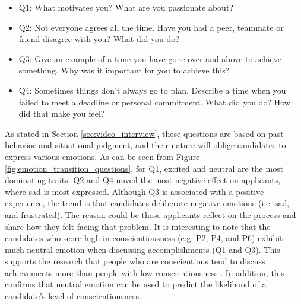 %
%
\begin{itemize}
    \item[] Q1: What motivates you? What are you passionate about?
    \item[] Q2: Not everyone agrees all the time. Have you had a peer, teammate or friend disagree with you? What did you do?
    \item[] Q3: Give an example of a time you have gone over and above to achieve something. Why was it important for you to achieve this?
    \item[] Q4: Sometimes things don’t always go to plan. Describe a time when you failed to meet a deadline or personal commitment. What did you do? How did that make you feel? 
\end{itemize}
%
As stated in Section \ref{sec:video_interview}, these questions are based on past behavior and situational judgment, and their nature will oblige candidates to express various emotions. As can be seen from Figure \ref{fig:emotion_transition_questions}, for Q1, excited and neutral are the most dominating traits. Q2 and Q4 unveil the most negative effect on applicants, where sad is most expressed. Although Q3 is associated with a positive experience, the trend is that candidates deliberate negative emotions (i.e. sad, and frustrated). The reason could be those applicants reflect on the process and share how they felt facing that problem. It is interesting to note that the candidates who score high in conscientiousness (e.g. P2, P4, and P6) exhibit much neutral emotion when discussing accomplishments (Q1 and Q3). This supports the research that people who are conscientious tend to discuss achievements more than people with low conscientiousness \cite{conscientiousness1-HIRSH2009524}. In addition, this confirms that neutral emotion can be used to predict the likelihood of a candidate's level of conscientiousness. 

